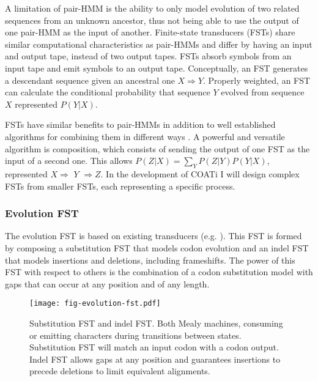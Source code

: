 A limitation of pair-HMM is the ability to only model evolution of two related
sequences from an unknown ancestor, thus not being able to use the output of one
pair-HMM as the input of another.
Finite-state transducers (FSTs) share similar computational characteristics as
pair-HMMs and differ by having an input and output tape, instead of two output
tapes.
FSTs absorb symbols from an input tape and emit symbols to an output tape.
Conceptually, an FST generates a descendant sequence given an ancestral one
$X \Rightarrow Y$.
Properly weighted, an FST can calculate the conditional probability that
sequence $Y$ evolved from sequence $X$ represented $P(Y|X)$.

FSTs have similar benefits to pair-HMMs in addition to well established
algorithms for combining them in different ways
\parencite{bradley2007transducers}.
A powerful and versatile algorithm is composition, which consists of sending the
output of one FST as the input of a second one.
This allows $P(Z|X) = \sum_Y P(Z|Y) P(Y|X)$, represented $X \Rightarrow$
$Y$ $\Rightarrow Z$.
In the development of COATi I will design complex FSTs from smaller FSTs, each
representing a specific process.

\subsubsection{Evolution FST}

The evolution FST is based on existing transducers
(e.g. \cite{holmes2001evolutionary}).
This FST is formed by composing a substitution FST that models codon
evolution and an indel FST that models insertions and deletions, including
frameshifts.
The power of this FST with respect to others is the combination of a codon
substitution model with gaps that can occur at any position and of any length.

\begin{figure}[h]
\centering
    \texttt{[image: fig-evolution-fst.pdf]}
    \caption{Substitution FST and indel FST. Both Mealy machines, consuming or
    emitting characters during transitions between states. Substitution FST will
    match an input codon with a codon output.
    Indel FST allows gaps at any position and guarantees insertions to precede
    deletions to limit equivalent alignments.}
    \label{fig:evolution-fst}
\end{figure}

\vspace{2em}

